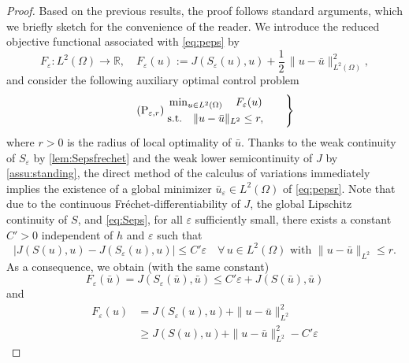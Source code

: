 \documentclass[reqno]{shinyart}
\begin{document}
\begin{proof}
    Based on the previous results, the proof follows standard arguments, which we briefly sketch for the convenience of the reader.
    We introduce the reduced objective functional associated with \eqref{eq:peps} by 
    \begin{equation*}
        F_\varepsilon : L^2(\Omega) \to {\mathbb{R}}, \quad
        F_\varepsilon(u) := J(S_\varepsilon(u), u) + \frac{1}{2}\,\|u - \bar{u}\|_{L^2(\Omega)}^2,
    \end{equation*}
    and consider the following auxiliary optimal control problem
    \begin{equation}\tag{P$_{\varepsilon,r}$}\label{eq:pepsr}
        \left.
            \begin{aligned}
                &\min\nolimits_{u\in L^2(\Omega)} \quad F_\varepsilon(u)\\
                &\text{s.t.}   \quad \|u - \bar{u}\|_{L^2} \leq r,
            \end{aligned}
        \qquad \right\}
    \end{equation}
    where $r>0$ is the radius of local optimality of $\bar{u}$.
    Thanks to the weak continuity of $S_\varepsilon$ by \cref{lem:Sepsfrechet} and 
    the weak lower semicontinuity of $J$ by \cref{assu:standing}, the 
    direct method of the calculus of variations immediately implies the existence of a 
    global minimizer  $\bar{u}_\varepsilon \in L^2(\Omega)$ of \eqref{eq:pepsr}.
    Note that due to the continuous Fr\'echet-differentiability of $J$, 
    the global Lipschitz continuity of $S$, and \eqref{eq:Seps}, for all $\varepsilon$ sufficiently small,
    there exists a constant $C' > 0$ independent of $h$ and $\varepsilon$ such that
    \begin{equation*}
        | J(S(u),u) -  J(S_\varepsilon(u),u) | \leq C'  \varepsilon \quad \forall\, u \in L^2(\Omega) 
        \text{ with } \|u - \bar{u}\|_{L^2} \leq r.
    \end{equation*}
    As a consequence, we obtain (with the same constant)
    \begin{equation*}
        F_\varepsilon(\bar{u}) = J(S_\varepsilon(\bar{u}),\bar{u})  
        \leq C'  \varepsilon  + J(S(\bar{u}),\bar{u})
    \end{equation*}
    and 
    \begin{align*}
        F_\varepsilon(u) &= J(S_\varepsilon(u),u) +  \|u - \bar{u}\|_{L^2}^2 \\
                         &\geq  J(S(u),u) +   \|u - \bar{u}\|_{L^2}^2 - C'  \varepsilon 

\end{align*}
\end{proof}
\end{document}
